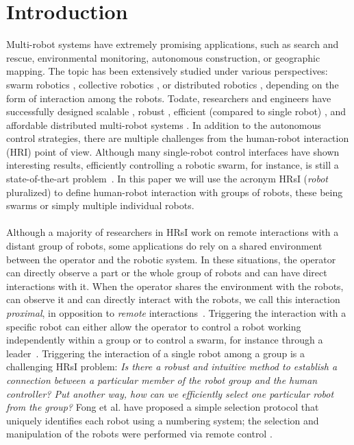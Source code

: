 \documentclass[smallextended]{svjour3}
\begin{document}
\section{Introduction}
\label{sec:introduction}
Multi-robot systems have extremely promising applications, such as search and rescue, environmental monitoring, autonomous construction, or geographic mapping. 
The topic has been extensively studied under various perspectives: swarm robotics \cite{brambilla2013}, collective robotics \cite{kernbach2013handbook}, or distributed robotics \cite{martinoli2012distributed}, depending on the form of interaction among the robots. 
Todate, researchers and engineers have successfully designed scalable \cite{rubenstein2012kilobot}, robust \cite{winfield2006safety}, efficient (compared to single robot) \cite{Bonani2012}, and affordable distributed multi-robot systems \cite{rubenstein2014programmable}. 
In addition to the autonomous control strategies, there are multiple challenges from the human-robot interaction (HRI) point of view. 
Although many single-robot control interfaces have shown interesting results, efficiently controlling a robotic swarm, for instance, is still a state-of-the-art problem~\cite{Kolling2016}.
In this paper we will use the acronym HRsI (\textit{robot} pluralized) to define human-robot interaction with groups of robots, these being swarms or simply multiple individual robots.\\
\\
Although a majority of researchers in HRsI work on remote interactions with a distant group of robots, some applications do rely on a shared environment between the operator and the robotic system. 
In these situations, the operator can directly observe a part or the whole group of robots and can have direct interactions with it. 
When the operator shares the environment with the robots, can observe it and can directly interact with the robots, we call this interaction \textit{proximal}, in opposition to \textit{remote} interactions~\cite{Kolling2016}.
Triggering the interaction with a specific robot can either allow the operator to control a robot working independently within a group or to control a swarm, for instance through a leader~\cite{Goodrich2012}.
Triggering the interaction of a single robot among a group is a challenging HRsI problem: \textit{Is there a robust and intuitive method to establish a connection between a particular member of the robot group and the human controller? 
Put another way, how can we efficiently select one particular robot from the group?} Fong et al. have proposed a simple selection protocol that uniquely identifies each robot using a numbering system; the selection and manipulation of the robots were performed via remote control \cite{fong2003}. 
\end{document}
